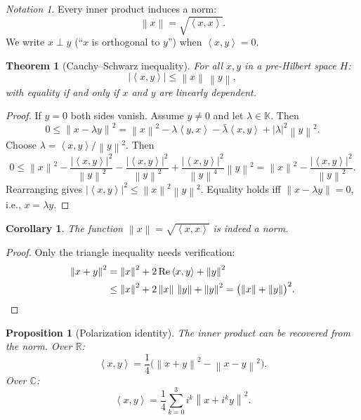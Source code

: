 \documentclass[a4paper,12pt]{book}
\newcommand{\R}{\mathbb{R}}
\newcommand{\C}{\mathbb{C}}
\newcommand{\K}{\mathbb{K}}
\newcommand{\norm}[1]{\left\| #1 \right\|}
\newcommand{\abs}[1]{\left| #1 \right|}
\newcommand{\inner}[2]{\left\langle #1, #2 \right\rangle}
\theoremstyle{definition}
\theoremstyle{plain}
\newtheorem{theorem}[definition]{Theorem}
\newtheorem{proposition}[definition]{Proposition}
\newtheorem{corollary}[definition]{Corollary}
\theoremstyle{remark}
\newtheorem{notation}[definition]{Notation}
\begin{document}
\begin{notation}
Every inner product induces a norm:
\[
  \norm{x} = \sqrt{\inner{x}{x}}.
\]
We write $x\perp y$ (``$x$ is orthogonal to $y$'')
when $\inner{x}{y}=0$.
\end{notation}

\begin{theorem}[Cauchy--Schwarz inequality]
\label{thm:cauchy-schwarz}
For all $x,y$ in a pre-Hilbert space $H$:
\[
  \abs{\inner{x}{y}} \le \norm{x}\,\norm{y},
\]
with equality if and only if $x$ and $y$ are linearly dependent.
\end{theorem}

\begin{proof}
If $y=0$ both sides vanish.  Assume $y\ne 0$ and let $\lambda\in\K$.
Then
\[
  0 \le \norm{x-\lambda y}^2
  = \norm{x}^2 - \lambda\inner{y}{x} - \bar\lambda\inner{x}{y}
    + \abs{\lambda}^2\norm{y}^2.
\]
Choose $\lambda = \inner{x}{y}/\norm{y}^2$.  Then
\[
  0 \le \norm{x}^2
  - \frac{\abs{\inner{x}{y}}^2}{\norm{y}^2}
  - \frac{\abs{\inner{x}{y}}^2}{\norm{y}^2}
  + \frac{\abs{\inner{x}{y}}^2}{\norm{y}^4}\norm{y}^2
  = \norm{x}^2 - \frac{\abs{\inner{x}{y}}^2}{\norm{y}^2}.
\]
Rearranging gives $\abs{\inner{x}{y}}^2\le\norm{x}^2\norm{y}^2$.
Equality holds iff $\norm{x-\lambda y}=0$, i.e., $x=\lambda y$.
\end{proof}

\begin{corollary}
The function $\norm{x}=\sqrt{\inner{x}{x}}$ is indeed a norm.
\end{corollary}

\begin{proof}
Only the triangle inequality needs verification:
\begin{align*}
  \norm{x+y}^2
  &= \norm{x}^2 + 2\operatorname{Re}\inner{x}{y} + \norm{y}^2 \\
  &\le \norm{x}^2 + 2\norm{x}\,\norm{y} + \norm{y}^2
  = \bigl(\norm{x}+\norm{y}\bigr)^2. \qedhere
\end{align*}
\end{proof}

\begin{proposition}[Polarization identity]
\label{prop:polarization}
The inner product can be recovered from the norm.  Over $\R$:
\[
  \inner{x}{y} = \frac{1}{4}\bigl(\norm{x+y}^2 - \norm{x-y}^2\bigr).
\]
Over $\C$:
\[
  \inner{x}{y} = \frac{1}{4}\sum_{k=0}^{3}i^k\norm{x+i^k y}^2.
\]
\end{proposition}
\end{document}
